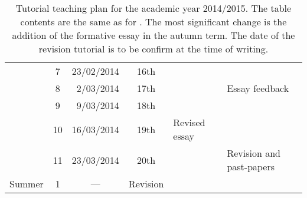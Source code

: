 \begin{table}
\begin{tabular}{c c r c l l}
			 & \hphantom{0}7 &	23/02/2014 & 16th		&			& \\
			 & \hphantom{0}8 &	 2/03/2014 & 17th		&			& Essay feedback \\
			 & \hphantom{0}9 &	 9/03/2014 & 18th		&			& \\
			 & 10		 &	16/03/2014 & 19th		& Revised essay		& \\
			 & 11		 &	23/03/2014 & 20th		&			& Revision and past-papers \\
\midrule
\multirow{1}{*}{Summer}	 & \hphantom{0}1 & \multicolumn{1}{c}{---} & Revision		&			& \\
 \bottomrule
\end{tabular}
\caption{Tutorial teaching plan for the academic year 2014/2015. The table contents are the same as for . The most significant change is the addition of the formative essay in the autumn term. The date of the revision tutorial is to be confirm at the time of writing.}\label{tab:2014-15}
\end{table}

